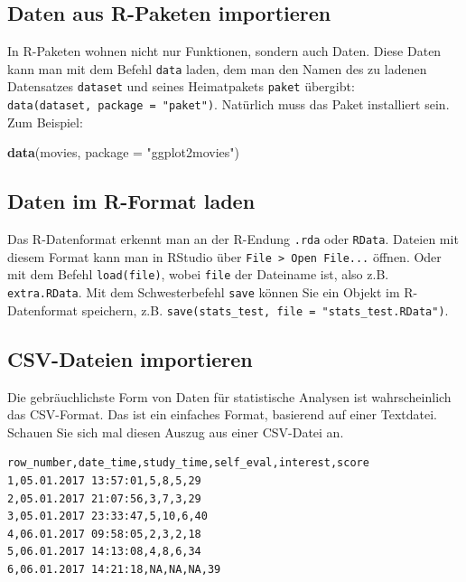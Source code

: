 \documentclass[12pt,ngerman,]{book}
\makeatletter
\newenvironment{Shaded}{\begin{snugshade}}{\end{snugshade}}
\newcommand{\KeywordTok}[1]{\textcolor[rgb]{0.13,0.29,0.53}{\textbf{#1}}}
\newcommand{\DataTypeTok}[1]{\textcolor[rgb]{0.13,0.29,0.53}{#1}}
\newcommand{\StringTok}[1]{\textcolor[rgb]{0.31,0.60,0.02}{#1}}
\newcommand{\NormalTok}[1]{#1}
\newenvironment{kframe}{%
\medskip{}
\setlength{\fboxsep}{.8em}
 \def\at@end@of@kframe{}%
 \ifinner\ifhmode%
  \def\at@end@of@kframe{\end{minipage}}%
  \begin{minipage}{\columnwidth}%
 \fi\fi%
 \def\FrameCommand##1{\hskip\@totalleftmargin \hskip-\fboxsep
 \colorbox{shadecolor}{##1}\hskip-\fboxsep
     \hskip-\linewidth \hskip-\@totalleftmargin \hskip\columnwidth}%
 \MakeFramed {\advance\hsize-\width
   \@totalleftmargin\z@ \linewidth\hsize
   \@setminipage}}%
 {\par\unskip\endMakeFramed%
 \at@end@of@kframe}
\renewenvironment{Shaded}{\begin{kframe}}{\end{kframe}}
\theoremstyle{definition}
\theoremstyle{definition}
\theoremstyle{remark}
\makeatother
\begin{document}
\subsection{Daten aus R-Paketen
importieren}\label{daten-aus-r-paketen-importieren}

In R-Paketen wohnen nicht nur Funktionen, sondern auch Daten. Diese
Daten kann man mit dem Befehl \texttt{data} laden, dem man den Namen des
zu ladenen Datensatzes \texttt{dataset} und seines Heimatpakets
\texttt{paket} übergibt: \texttt{data(dataset,\ package\ =\ "paket")}.
Natürlich muss das Paket installiert sein. Zum Beispiel:

\begin{Shaded}
\begin{Highlighting}[]
\KeywordTok{data}\NormalTok{(movies, }\DataTypeTok{package =} \StringTok{"ggplot2movies"}\NormalTok{)}
\end{Highlighting}
\end{Shaded}

\subsection{Daten im R-Format laden}\label{daten-im-r-format-laden}

Das R-Datenformat erkennt man an der R-Endung \texttt{.rda} oder
\texttt{RData}. Dateien mit diesem Format kann man in RStudio über
\texttt{File\ \textgreater{}\ Open\ File...} öffnen. Oder mit dem Befehl
\texttt{load(file)}, wobei \texttt{file} der Dateiname ist, also z.B.
\texttt{extra.RData}. Mit dem Schwesterbefehl \texttt{save} können Sie
ein Objekt im R-Datenformat speichern, z.B.
\texttt{save(stats\_test,\ file\ =\ "stats\_test.RData")}.

\subsection{CSV-Dateien importieren}\label{csv-dateien-importieren}

Die gebräuchlichste Form von Daten für statistische Analysen ist
wahrscheinlich das CSV-Format. Das ist ein einfaches Format, basierend
auf einer Textdatei. Schauen Sie sich mal diesen Auszug aus einer
CSV-Datei an.

\begin{verbatim}
row_number,date_time,study_time,self_eval,interest,score
1,05.01.2017 13:57:01,5,8,5,29
2,05.01.2017 21:07:56,3,7,3,29
3,05.01.2017 23:33:47,5,10,6,40
4,06.01.2017 09:58:05,2,3,2,18
5,06.01.2017 14:13:08,4,8,6,34
6,06.01.2017 14:21:18,NA,NA,NA,39
\end{verbatim}
\end{document}
